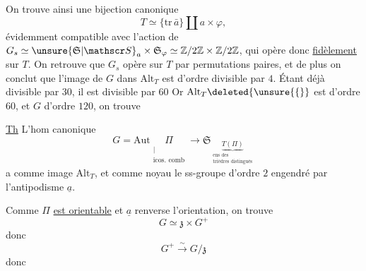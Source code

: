On trouve ainsi une bijection canonique
\[
T\simeq\{\mathrm{tr}\,\bar a\}\amalg a\times\varphi,
\]
évidemment compatible avec l'action de $G_s\simeq\unsure{\mathfrak S|\mathscr S}_a\times\mathfrak S_\varphi\simeq\mathbb Z/2\mathbb Z\times\mathbb Z/2\mathbb Z$, qui opère donc \uline{fidèlement} sur $T$. On retrouve que $G_s$ opère sur $T$ par permutations paires, et  de plus on conclut que l'image de $G$ dans $\mathrm{Alt}_T$ est d'ordre divisible par $4$. Étant déjà  divisible par $30$, il est divisible par $60$ Or $\mathrm{Alt}_T\deleted{\unsure{\{}}$ est d'ordre $60$,  et  $G$ d'ordre $120$, on trouve

\uline{Th} L'hom canonique
\[
G=\mathrm{Aut}\underset{\substack{|\\\text{icos. comb}}}{\Pi}
 \longrightarrow\mathfrak S_{\underbrace{T(\Pi)}_{\substack{\text{ens des}\\\text{trièdres distingués}}}}
\]
a comme image $\mathrm{Alt}_T$, et comme noyau le ss-groupe  d'ordre $2$ engendré par l'antipodisme $\underline a$.

Comme  $\Pi$ \uline{est orientable} et $\underline a$ renverse  l'orientation, on trouve
\[
G\simeq \mathfrak z\times G^+
\]
donc
\[
G^+\xrightarrow{\sim}G/\mathfrak z
\]
donc

